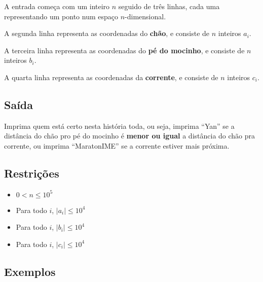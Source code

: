 A entrada começa com um inteiro $n$ seguido de três linhas, cada uma
representando um ponto num espaço $n$-dimensional.

A segunda  linha representa as coordenadas do \textbf{chão}, e consiste de $n$ inteiros $a_i$.

A terceira linha representa as coordenadas do \textbf{pé do mocinho}, e consiste de $n$ inteiros $b_i$.

A quarta   linha representa as coordenadas da \textbf{corrente}, e consiste de $n$ inteiros $c_i$.

\subsection*{Saída}

Imprima quem está certo nesta história toda, ou seja, imprima ``Yan'' se a distância do
chão pro pé do mocinho é \textbf{menor ou igual} a distância do chão pra corrente, ou
imprima ``MaratonIME'' se a corrente estiver mais próxima.


\subsection*{Restrições}
\begin{itemize}
  \item $0 < n \leq 10^5$
  \item Para todo $i$, $|a_i| \leq 10^4$
  \item Para todo $i$, $|b_i| \leq 10^4$
  \item Para todo $i$, $|c_i| \leq 10^4$
\end{itemize}

\subsection*{Exemplos}

\begin{center}

\end{center}
